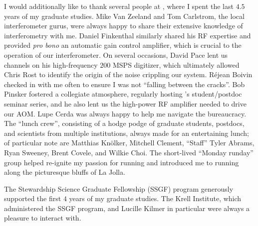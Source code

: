 I would additionally like to thank several people at \diiid,
where I spent the last $4.5$ years of my graduate studies.
Mike Van Zeeland and Tom Carlstrom,
the local interferometer gurus,
were always happy to share their extensive knowledge
of interferometry with me.
Daniel Finkenthal similarly shared his RF expertise and
provided \emph{pro bono} an automatic gain control amplifier, which
is crucial to the operation of our interferometer.
On several occasions, David Pace lent us channels
on his high-frequency $200$ MSPS digitizer, which
ultimately allowed Chris Rost to identify
the origin of the noise crippling our system.
R\'{e}jean Boivin checked in with me often
to ensure I was not ``falling between the cracks''.
Bob Pinsker fostered a collegiate atmosphere,
regularly hosting \diiid's student/postdoc seminar series, and
he also lent us the high-power RF amplifier needed to drive our AOM.
Lupe Cerda was always happy to help me navigate the \diiid\space bureaucracy.
The \diiid\space ``lunch crew'',
consisting of a hodge podge of graduate students, postdocs, and scientists
from multiple institutions,
always made for an entertaining lunch;
of particular note are
Matthias Kn{\"o}lker,
Mitchell Clement,
``Staff'' Tyler Abrams,
Ryan Sweeney,
Brent Covele, and
Wilkie Choi.
The short-lived ``Monday runday'' group
helped re-ignite my passion for running and
introduced me to running along the picturesque bluffs of La Jolla.

The Stewardship Science Graduate Fellowship (SSGF) program
generously supported the first $4$ years of my graduate studies.
The Krell Institute, which administered the SSGF program, and
Lucille Kilmer in particular
were always a pleasure to interact with.

